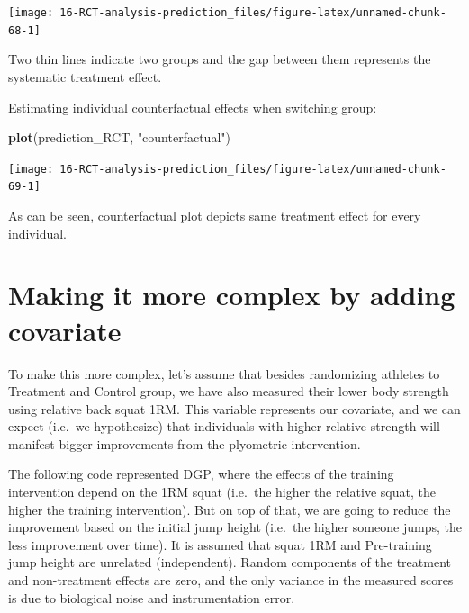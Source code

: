 \documentclass[
]{book}
\newenvironment{Shaded}{\begin{snugshade}}{\end{snugshade}}
\newcommand{\KeywordTok}[1]{\textcolor[rgb]{0.13,0.29,0.53}{\textbf{#1}}}
\newcommand{\NormalTok}[1]{#1}
\newcommand{\StringTok}[1]{\textcolor[rgb]{0.31,0.60,0.02}{#1}}
\begin{document}
\begin{center}\texttt{[image: 16-RCT-analysis-prediction\_files/figure-latex/unnamed-chunk-68-1]} \end{center}

Two thin lines indicate two groups and the gap between them represents the systematic treatment effect.

Estimating individual counterfactual effects when switching group:

\begin{Shaded}
\begin{Highlighting}[]
\KeywordTok{plot}\NormalTok{(prediction\_RCT, }\StringTok{"counterfactual"}\NormalTok{)}
\end{Highlighting}
\end{Shaded}

\begin{center}\texttt{[image: 16-RCT-analysis-prediction\_files/figure-latex/unnamed-chunk-69-1]} \end{center}

As can be seen, counterfactual plot depicts same treatment effect for every individual.

\hypertarget{making-it-more-complex-by-adding-covariate}{%
\section{Making it more complex by adding covariate}\label{making-it-more-complex-by-adding-covariate}}

To make this more complex, let's assume that besides randomizing athletes to Treatment and Control group, we have also measured their lower body strength using relative back squat 1RM. This variable represents our covariate, and we can expect (i.e.~we hypothesize) that individuals with higher relative strength will manifest bigger improvements from the plyometric intervention.

The following code represented DGP, where the effects of the training intervention depend on the 1RM squat (i.e.~the higher the relative squat, the higher the training intervention). But on top of that, we are going to reduce the improvement based on the initial jump height (i.e.~the higher someone jumps, the less improvement over time). It is assumed that squat 1RM and Pre-training jump height are unrelated (independent). Random components of the treatment and non-treatment effects are zero, and the only variance in the measured scores is due to biological noise and instrumentation error.
\end{document}
